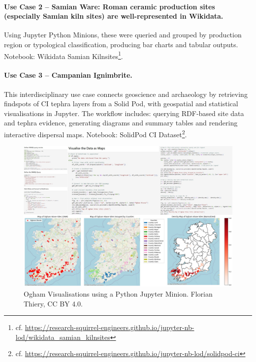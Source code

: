 \documentclass{eceasst}
\begin{document}
\paragraph{Use Case 2 – Samian Ware: Roman ceramic production sites (especially Samian kiln sites) are well-represented in Wikidata.} Using Jupyter Python Minions, these were queried and grouped by production region or typological classification, producing bar charts and tabular outputs. Notebook: Wikidata Samian Kilnsites\footnote{cf. \url{https://research-squirrel-engineers.github.io/jupyter-nb-lod/wikidata_samian_kilnsites}}.

\paragraph{Use Case 3 – Campanian Ignimbrite.} This interdisciplinary use case connects geoscience and archaeology by retrieving findspots of CI tephra layers from a Solid Pod, with geospatial and statistical visualisations in Jupyter. The workflow includes: querying RDF-based site data and tephra evidence, generating diagrams and summary tables and rendering interactive dispersal maps. Notebook: SolidPod CI Dataset\footnote{cf. \url{https://research-squirrel-engineers.github.io/jupyter-nb-lod/solidpod-ci}}.

\begin{figure}[h!]
    \centering
    \includegraphics[width=0.95\linewidth]{ECEASST-LaTeX-Templates/img/Python Minions.png}
    \caption{Ogham Visualisations using a Python Jupyter Minion. Florian Thiery, CC BY 4.0.}
    \label{fig:minion}
\end{figure}
\end{document}
